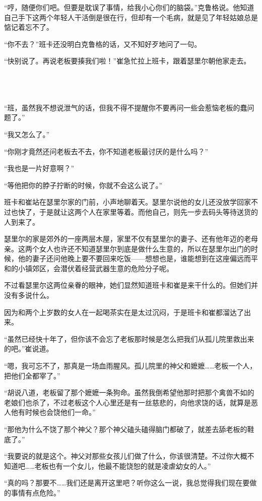 “哼，随便你们吧。但要是耽误了事情，给我小心你们的脑袋。”克鲁格说。他知道自己手下这两个年轻人干活倒是很在行，但却有一个毛病，就是见了年轻姑娘总是惦记着忘不了。

“你不去？”班卡还没明白克鲁格的话，又不知好歹地问了一句。

“快别说了。再说老板要揍我们啦！”崔急忙拉上班卡，跟着瑟里尔朝他家走去。

 \section*{}

“班，虽然我不想说泄气的话，但我不得不提醒你不要再问一些会惹恼老板的蠢问题了。”

“我又怎么了。”

“你刚才竟然还问老板去不去，你不知道老板最讨厌的是什么吗？”

“我也是一片好意啊？”

“等他把你的脖子拧断的时候，你就不会这么说了。”

班卡和崔站在瑟里尔家的门前，小声地聊着天。瑟里尔说他的女儿还没放学回家不过也快了，于是就让这两个人在家里等着。而他自己，则先一步去码头等待送货的人到来了。

瑟里尔的家是郊外的一座两层木屋，家里不仅有瑟里尔的妻子、还有他年迈的老母亲。这两个女人也许还不知道瑟里尔到底是做什么生意的，所以在瑟里尔出门的时候，他的妻子还问他晚上要不要回来吃饭——想想也是，谁能想到在这座偏远而平和的小镇郊区，会潜伏着经营武器生意的危险分子呢。

不过看瑟里尔这两位亲眷的眼神，她们显然知道班卡和崔是来干什么的。但她们并没有多说什么。

因为和两个上岁数的女人在一起喝茶实在是太过沉闷，于是班卡和崔都溜达了出来。

“虽然已经快十年了，但你该不会忘了老板那时候是怎么把我们从孤儿院里救出来的吧。”崔说道。

“嗯，我可忘不了，那真是一场血雨腥风。孤儿院里的神父和嬷嬷……老板一个人，把他们全都宰了。”

“胡说八道，老板留了那个嬷嬷一条狗命。虽然我倒希望他那时把那个禽兽不如的老娘们也杀了，不过老板这个人心里还是有一丝慈悲的，向他求饶的话，就算是恶人他有时候也会饶他们一命。”

“那他为什么不饶了那个神父？那个神父磕头磕得脑门都破了，就差去舔老板的鞋底了。”

“我要说的就是这个。神父对那些女孩儿们做了什么，你该很清楚。不过你大概不知道吧……老板也有一个女儿，他最不能饶恕的就是凌虐幼女的人。”

“真的吗？那要不……我们还是离开这里吧？听你这么一说，我总觉得我们现在要做的事情有点危险。”


